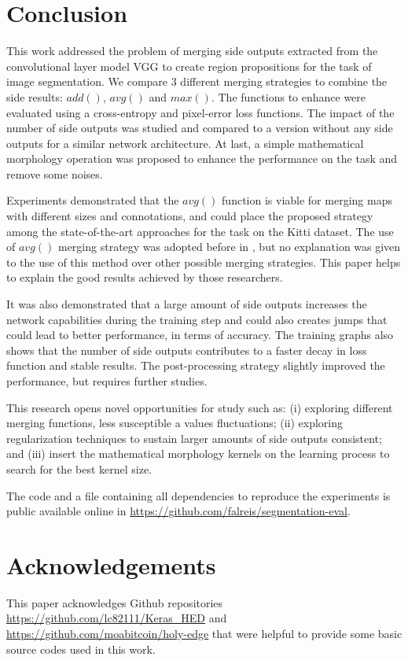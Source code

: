 \section{Conclusion}
\label{sec:conclusion}

This work addressed the problem of merging side outputs extracted from the convolutional layer model VGG to create region propositions for the task of image segmentation. We compare 3 different merging strategies to combine the side results: $add()$, $avg()$ and $max()$. The functions to enhance were evaluated using a cross-entropy and pixel-error loss functions. The impact of the number of side outputs was studied and compared to a version without any side outputs for a similar network architecture. At last, a simple mathematical morphology operation was proposed to  enhance the performance on the task and remove some noises. 

Experiments demonstrated that the $avg()$ function is viable for merging maps with different sizes and connotations, and could place the proposed strategy among the state-of-the-art approaches for the task on the Kitti dataset. The use of $avg()$ merging strategy was adopted before in \cite{liu2017}, but no explanation was given to the use of this method over other possible merging strategies. This paper helps to explain the good results achieved by those researchers.

It was also demonstrated that a large amount of side outputs increases the network capabilities during the training step and could also creates jumps that could lead to better performance, in terms of accuracy. The training graphs also shows that the number of side outputs contributes to a faster decay in loss function and stable results. The post-processing strategy slightly improved the performance, but requires further studies.

This research opens novel opportunities for study such as: (i) exploring different merging functions, less susceptible a values fluctuations;  (ii) exploring regularization techniques to sustain larger amounts of side outputs consistent; and (iii) insert the mathematical morphology kernels on the learning process to search for the best kernel size. 
 
The code  and a file containing all dependencies to reproduce the experiments is public available online in \url{https://github.com/falreis/segmentation-eval}. 

\section{Acknowledgements}
\label{sec:acknowledgements}

This paper acknowledges Github repositories \url{https://github.com/lc82111/Keras_HED} and \url{https://github.com/moabitcoin/holy-edge} that were helpful to provide some basic source codes used in this work.
